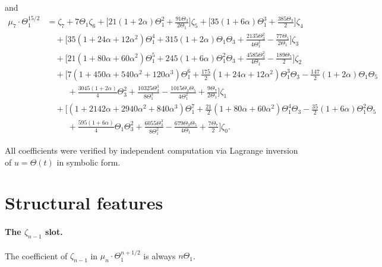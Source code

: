 \documentclass[11pt]{amsart}
\theoremstyle{definition}
\begin{document}
and
\begin{align*}
\mu_7\cdot\Theta_1^{15/2} &= \zeta_7 + 7\Theta_1\zeta_6
   + \bigl[21(1+2\alpha)\Theta_1^{2}+\tfrac{91\Theta_3}{2\Theta_1}\bigr]\zeta_5
   + \bigl[35(1+6\alpha)\Theta_1^{3}+\tfrac{385\Theta_3}{2}\bigr]\zeta_4\\
   &\quad + \bigl[35(1+24\alpha+12\alpha^2)\Theta_1^{4}
           + 315(1+2\alpha)\Theta_1\Theta_3
           + \tfrac{2135\Theta_3^{2}}{4\Theta_1^{2}}
           - \tfrac{77\Theta_5}{2\Theta_1}\bigr]\zeta_3\\
   &\quad + \bigl[21(1+80\alpha+60\alpha^2)\Theta_1^{5}
           + 245(1+6\alpha)\Theta_1^{2}\Theta_3
           + \tfrac{4585\Theta_3^{2}}{4\Theta_1}
           - \tfrac{189\Theta_5}{2}\bigr]\zeta_2\\
   &\quad + \bigl[7(1+450\alpha+540\alpha^2+120\alpha^3)\Theta_1^{6}
           + \tfrac{175}{2}(1+24\alpha+12\alpha^2)\Theta_1^{3}\Theta_3
           - \tfrac{147}{2}(1+2\alpha)\Theta_1\Theta_5\\
   &\quad\phantom{{}+\bigl[}
           + \tfrac{3045(1+2\alpha)}{4}\Theta_3^{2}
           + \tfrac{10325\Theta_3^{3}}{8\Theta_1^{3}}
           - \tfrac{1015\Theta_3\Theta_5}{4\Theta_1^{2}}
           + \tfrac{9\Theta_7}{2\Theta_1}\bigr]\zeta_1\\
   &\quad + \bigl[(1+2142\alpha+2940\alpha^2+840\alpha^3)\Theta_1^{7}
           + \tfrac{21}{2}(1+80\alpha+60\alpha^2)\Theta_1^{4}\Theta_3
           - \tfrac{35}{2}(1+6\alpha)\Theta_1^{2}\Theta_5\\
   &\quad\phantom{{}+\bigl[}
           + \tfrac{595(1+6\alpha)}{4}\Theta_1\Theta_3^{2}
           + \tfrac{6055\Theta_3^{3}}{8\Theta_1^{2}}
           - \tfrac{679\Theta_3\Theta_5}{4\Theta_1}
           + \tfrac{7\Theta_7}{2}\bigr]\zeta_0.
\end{align*}

All coefficients were verified by independent computation via Lagrange inversion
of $u=\Theta(t)$ in symbolic form.

\section{Structural features}

\paragraph{The $\zeta_{n-1}$ slot.}
The coefficient of $\zeta_{n-1}$ in $\mu_n\cdot\Theta_1^{n+1/2}$ is always $n\Theta_1$.
\end{document}
